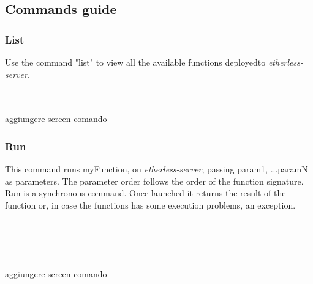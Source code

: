 \subsection{Commands guide}
\subsubsection{List}
Use the command "list" to view all the available functions deployed\glo to \textit{etherless-server}.\\\\
\centerline{}

\\aggiungere screen comando




\subsubsection{Run}
This command runs myFunction, on \textit{etherless-server}, passing param1, ...paramN as parameters. The parameter order follows the order of the function signature. Run is a synchronous command. Once launched it returns the result of the function or, in case the functions has some execution problems, an exception.\\\\
\centerline{}\\
\\
\\
aggiungere screen comando

